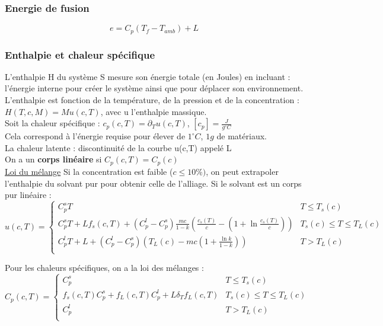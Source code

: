 \documentclass[../main.tex]{subfiles}
\begin{document}
\subsubsection{Energie de fusion}
\begin{equation}
    e = C_p(T_f-T_{amb}) + L
\end{equation}

\subsubsection{Enthalpie et chaleur spécifique}
L'enthalpie H du système S mesure son énergie totale (en Joules) en incluant : \\
l'énergie interne pour créer le système ainsi que pour déplacer son environnement.\\

L'enthalpie est fonction de la température, de la pression et de la concentration : $H(T,c,M) = Mu(c,T)$, avec u l'enthalpie massique. \\

Soit la chaleur spécifique : $c_p(c,T) = \partial_T u(c,T)$, $[c_p] = \frac{J}{g ^{\circ}C}$\\
Cela correspond à l'énergie requise pour élever de $1^{\circ}C$, $1g$ de matériaux.\\

La chaleur latente : discontinuité de la courbe u(c,T) appelé L\\

On a un \textbf{corps linéaire} si $C_p(c,T)=C_p(c)$\\

\quad \underline{Loi du mélange}
Si la concentration est faible ($c \leq 10\%)$, on peut extrapoler l'enthalpie du solvant pur pour obtenir celle de l'alliage. Si le solvant est un corps pur linéaire :\\
\begin{equation}
    u(c,T) = \begin{cases}
        C_p^s T & T\leq T_s(c)\\
        C_p^s T + Lf_s(c,T) + (C_p^l-C_p^s) \frac{mc}{1-k} (\frac{c_s(T)}{c}-(1+\ln{\frac{c_s(T)}{c}})) & T_s(c) \leq T \leq T_L(c)\\
        C_p^l T + L + (C_p^l - C_p^s)(T_L(c) - mc(1+\frac{\ln{k}}{1-k})) & T>T_L(c)\\
    \end{cases}
\end{equation}

Pour les chaleurs spécifiques, on a la loi des mélanges :\\
\begin{equation}
    C_p(c,T) = \begin{cases}
        C_p^s & T \leq T_s(c)\\
        f_s(c,T) C_p^s + f_L(c,T)C_p^l + L\delta_T f_L(c,T) & T_s(c) \leq T \leq T_L(c)\\
        C_p^l & T>T_L(c)\\
    \end{cases}
\end{equation}
\end{document}
